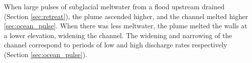 When large pulses of subglacial meltwater from a flood upstream drained (Section \ref{sec:retreat}), the plume ascended higher, and the channel melted higher \ref{sec:ocean_pulse}. When there was less meltwater, the plume melted the walls at a lower elevation, widening the channel. The widening and narrowing of the channel correspond to periods of low and high discharge rates respectively (Section \ref{sec:ocean_pulse}).

